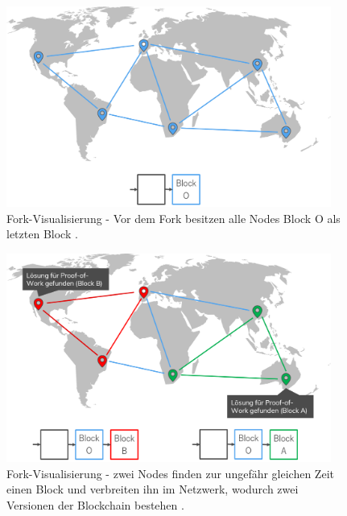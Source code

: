 \begin{figure}[!htbp]
  \centering
    \includegraphics[width=0.95\textwidth,angle=0]{images/fork_1}
 	\caption{Fork-Visualisierung - Vor dem Fork besitzen alle Nodes Block O als letzten Block \cite[S.~200 ff.]{AntonopoulosMasteringbitcoin2015}.}
	\label{fig:fork_1}
\end{figure}

\begin{figure}[!htbp]
  \centering
	\includegraphics[width=0.95\textwidth,angle=0]{images/fork_2}
 	\caption{Fork-Visualisierung - zwei Nodes finden zur ungefähr gleichen Zeit einen Block und verbreiten ihn im Netzwerk, wodurch zwei Versionen der Blockchain bestehen \cite[S.~200 ff.]{AntonopoulosMasteringbitcoin2015}.}
	\label{fig:fork_2}
\end{figure}

